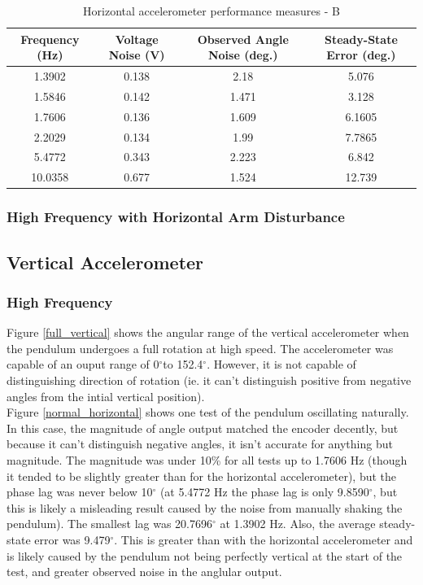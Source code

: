 \documentclass{article}
\theoremstyle{plain}
\theoremstyle{definition}
\theoremstyle{remark}
\begin{document}
\begin{table}
\begin{center}
    \begin{tabular}{|c|c|c|c|}
        \hline
        Frequency (Hz)  & Voltage Noise (V) & Observed Angle Noise (deg.) & Steady-State Error (deg.) \\ \hline
	1.3902  & 0.138  & 2.18 & 5.076\\
       1.5846  & 0.142  & 1.471 & 3.128 \\
	1.7606  & 0.136 & 1.609 & 6.1605  \\
	2.2029 & 0.134  & 1.99 & 7.7865   \\
	5.4772 & 0.343  & 2.223 & 6.842  \\
	10.0358 & 0.677 & 1.524 & 12.739 \\
        \hline
    \end{tabular}
\caption{Horizontal accelerometer performance measures - B}  
\label{horizontal_tableB}
\end{center}
\end{table}


\subsubsection{High Frequency with Horizontal Arm Disturbance}

\clearpage

\subsection{Vertical Accelerometer}
\subsubsection{High Frequency}

Figure \ref{full_vertical} shows the angular range of the vertical accelerometer when the pendulum undergoes a full rotation at high speed. The accelerometer was capable of an ouput range of 0$^{\circ}$to 152.4$^{\circ}$. However, it is not capable of distinguishing direction of rotation (ie. it can't distinguish positive from negative angles from the intial vertical position). \\

Figure \ref{normal_horizontal} shows one test of the pendulum oscillating naturally. In this case, the magnitude of angle output matched the encoder decently, but because it can't distinguish negative angles, it isn't accurate for anything but magnitude. The magnitude was under 10\% for all tests up to 1.7606 Hz (though it tended to be slightly greater than for the horizontal accelerometer), but the phase lag was never below 10$^{\circ}$ (at 5.4772 Hz the phase lag is only 9.8590$^{\circ}$, but this is likely a misleading result caused by the noise from manually shaking the pendulum). The smallest lag was 20.7696$^{\circ}$ at 1.3902 Hz. Also, the average steady-state error was 9.479$^{\circ}$. This is greater than with the horizontal accelerometer and is likely caused by the pendulum not being perfectly vertical at the start of the test, and greater observed noise in the anglular output.\\ 
\end{document}
